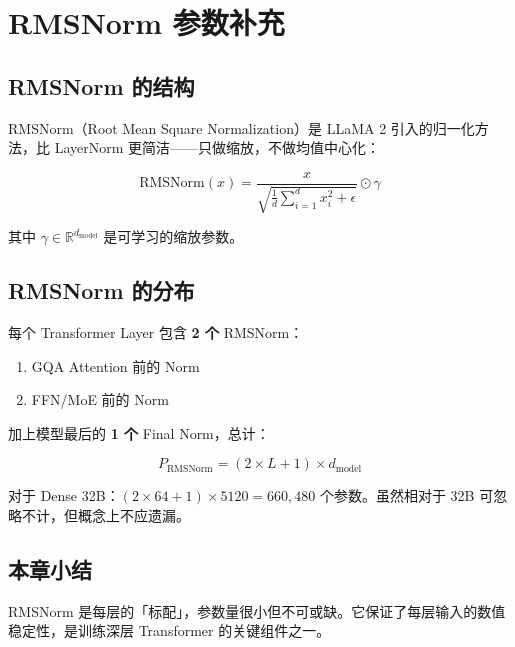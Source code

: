 \section{RMSNorm 参数补充}

\subsection{RMSNorm 的结构}

RMSNorm（Root Mean Square Normalization）是 LLaMA 2 引入的归一化方法，比 LayerNorm 更简洁——只做缩放，不做均值中心化：

$$
\text{RMSNorm}(x) = \frac{x}{\sqrt{\frac{1}{d}\sum_{i=1}^d x_i^2 + \epsilon}} \odot \gamma
$$

其中 $\gamma \in \mathbb{R}^{d_{\text{model}}}$ 是可学习的缩放参数。

\subsection{RMSNorm 的分布}

每个 Transformer Layer 包含 \textbf{2 个} RMSNorm：
\begin{enumerate}
  \item GQA Attention 前的 Norm
  \item FFN/MoE 前的 Norm
\end{enumerate}

加上模型最后的 \textbf{1 个} Final Norm，总计：

$$
P_{\text{RMSNorm}} = (2 \times L + 1) \times d_{\text{model}}
$$

对于 Dense 32B：$(2 \times 64 + 1) \times 5120 = 660{,}480$ 个参数。虽然相对于 32B 可忽略不计，但概念上不应遗漏。

\subsection{本章小结}

RMSNorm 是每层的「标配」，参数量很小但不可或缺。它保证了每层输入的数值稳定性，是训练深层 Transformer 的关键组件之一。


